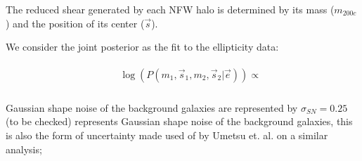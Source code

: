 The reduced shear generated by each NFW halo is determined by its
mass ($m_{200c}$) and the position of its center ($\vec{s}$). 
\par
We consider the joint posterior as the fit to the ellipticity data:

\begin{align}
    &\begin{aligned}
			&\log(P( m_{1}, \vec{s}_{1}, m_{2}, \vec{s}_{2} | \vec{e} )) \propto\\
    \end{aligned}
\end{align} 

Gaussian shape noise of the background galaxies are represented by $\sigma_{SN} = 0.25$(to be checked) represents Gaussian shape noise
of the background galaxies, this is also the form of uncertainty made used
of by Umetsu et. al. on a similar analysis; 


